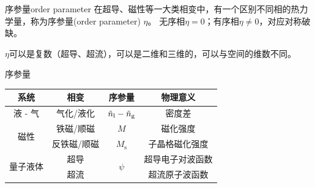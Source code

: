 \begin{definition}
	{序参量}{order parameter}
	在超导、磁性等一大类相变中，有一个区别不同相的热力学量，称为序参量(order parameter) $\eta$。
	无序相$\eta=0$；有序相$\eta\neq 0$，对应对称破缺。
\end{definition}

\begin{remark}
	$\eta$可以是复数（超导、超流），可以是二维和三维的，可以与空间的维数不同。
\end{remark}

\begin{example}
	{序参量}{}
	\begin{center}
		\begin{tabular}{cccc}
			\toprule
			系统 & 相变 & 序参量 & 物理意义 \\
			\hline
			液 - 气 & 气化/液化 & $\tilde n_{\mathrm{l}}-\tilde n_{\mathrm{g}}$ & 密度差 \\
			\multirow{2}{*}{磁性} & 铁磁/顺磁 & $M$ & 磁化强度 \\
			& 反铁磁/顺磁 & $M_{\mathrm{s}}$ & 子晶格磁化强度 \\
			\multirow{2}{*}{量子液体} & 超导 & \multirow{2}{*}{$\psi$} & 超导电子对波函数 \\
			& 超流 & & 超流原子波函数 \\
			\bottomrule
		\end{tabular}
		\label{tab:order parameter}
	\end{center}
\end{example}

